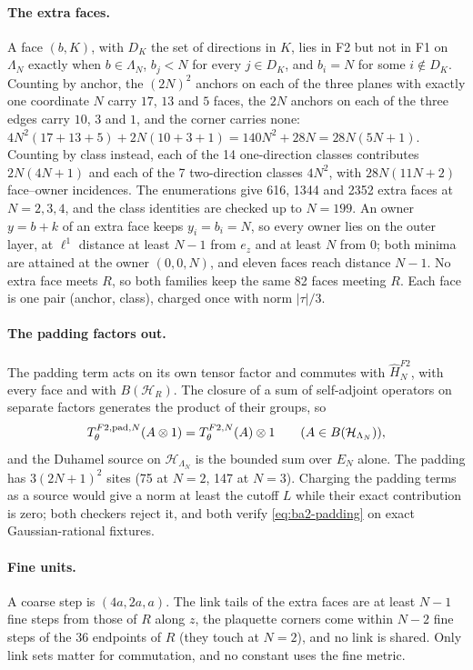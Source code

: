 \paragraph{The extra faces.} A face $(b,K)$, with $D_K$ the set of
directions in $K$, lies in F2 but not in F1 on $\Lambda_N$ exactly when
$b\in\Lambda_N$, $b_j<N$ for every $j\in D_K$, and $b_i=N$ for some $i\notin
D_K$. Counting by anchor, the $(2N)^2$ anchors on each of the three planes
with exactly one coordinate $N$ carry $17$, $13$ and $5$ faces, the $2N$
anchors on each of the three edges carry $10$, $3$ and $1$, and the corner
carries none: $4N^2(17+13+5)+2N(10+3+1)=140N^2+28N=28N(5N+1)$. Counting by
class instead, each of the 14 one-direction classes contributes $2N(4N+1)$
and each of the 7 two-direction classes $4N^2$, with $28N(11N+2)$ face--owner
incidences. The enumerations give 616, 1344 and 2352 extra faces at
$N=2,3,4$, and the class identities are checked up to $N=199$. An owner
$y=b+k$ of an extra face keeps $y_i=b_i=N$, so every owner lies on the outer
layer, at $\ell^1$ distance at least $N-1$ from $e_z$ and at least $N$ from
$0$; both minima are attained at the owner $(0,0,N)$, and eleven faces reach
distance $N-1$. No extra face meets $R$, so both families keep the same 82
faces meeting $R$. Each face is one pair (anchor, class), charged once with
norm $|\tau|/3$.

\paragraph{The padding factors out.} The padding term acts on its own tensor
factor and commutes with $\widehat H^{F2}_N$, with every face and with
$B(\mathcal H_R)$. The closure of a sum of self-adjoint operators on separate
factors generates the product of their groups, so
\begin{equation}
 T^{F2,{\rm pad},N}_\theta(A\otimes1)=T^{F2,N}_\theta(A)\otimes1
 \qquad(A\in B(\mathcal H_{\Lambda_N})),
 \label{eq:ba2-padding}
\end{equation}
and the Duhamel source on $\mathcal H_{\Lambda_N}$ is the bounded sum over
$E_N$ alone. The padding has $3(2N+1)^2$ sites (75 at $N=2$, 147 at $N=3$).
Charging the padding terms as a source would give a norm at least the cutoff
$L$ while their exact contribution is zero; both checkers reject it, and both
verify \eqref{eq:ba2-padding} on exact Gaussian-rational fixtures.

\paragraph{Fine units.} A coarse step is $(4a,2a,a)$. The link tails of the
extra faces are at least $N-1$ fine steps from those of $R$ along $z$, the
plaquette corners come within $N-2$ fine steps of the 36 endpoints of $R$
(they touch at $N=2$), and no link is shared. Only link sets matter for
commutation, and no constant uses the fine metric.

